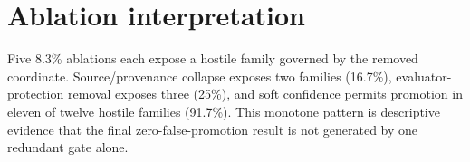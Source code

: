 \section{Ablation interpretation}
Five 8.3\% ablations each expose a hostile family governed by the removed coordinate. Source/provenance collapse exposes two families (16.7\%), evaluator-protection removal exposes three (25\%), and soft confidence permits promotion in eleven of twelve hostile families (91.7\%). This monotone pattern is descriptive evidence that the final zero-false-promotion result is not generated by one redundant gate alone.

